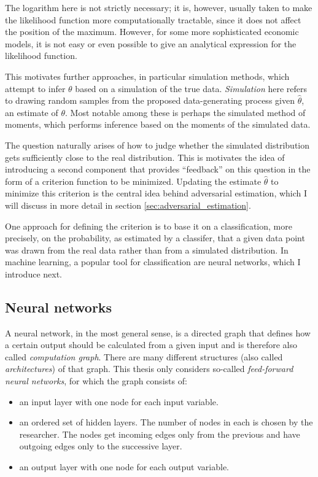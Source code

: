 The logarithm here is not strictly necessary; it is, however, usually taken to make the likelihood function more computationally tractable, since it does not affect the position of the maximum.
However, for some more sophisticated economic models, it is not easy or even possible to give an analytical expression for the likelihood function.

This motivates further approaches, in particular simulation methods, which attempt to infer $\theta$ based on a simulation of the true data.
\textit{Simulation} here refers to drawing random samples from the proposed data-generating process given $\hat{\theta}$, an estimate of $\theta$. %
Most notable among these is perhaps the simulated method of moments, which performs inference based on the moments of the simulated data. %

The question naturally arises of how to judge whether the simulated distribution gets sufficiently close to the real distribution.
This is motivates the idea of introducing a second component that provides ``feedback'' on this question in the form of a criterion function to be minimized.
Updating the estimate $\hat{\theta}$ to minimize this criterion is the central idea behind adversarial estimation, which I will discuss in more detail in section \ref{sec:adversarial_estimation}.

One approach for defining the criterion is to base it on a classification, more precisely, on the probability, as estimated by a classifer, that a given data point was drawn from the real data rather than from a simulated distribution.
In machine learning, a popular tool for classification are neural networks, which I introduce next.

\subsection{Neural networks}
\label{sec:neural_networks}

A neural network, in the most general sense, is a directed graph that defines how a certain output should be calculated from a given input and is therefore also called \textit{computation graph}.
There are many different structures (also called \textit{architectures}) of that graph.
This thesis only considers so-called \textit{feed-forward neural networks}, for which the graph consists of:

\begin{itemize}
    \item an input layer with one node for each input variable.
    \item an ordered set of hidden layers. The number of nodes in each is chosen by the researcher. The nodes get incoming edges only from the previous and have outgoing edges only to the successive layer.
    \item an output layer with one node for each output variable.
\end{itemize}

